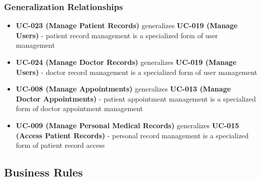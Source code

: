 \documentclass[12pt,a4paper]{article}
\begin{document}
\subsubsection{Generalization Relationships}
\begin{itemize}
    \item \textbf{UC-023 (Manage Patient Records)} generalizes \textbf{UC-019 (Manage Users)} - patient record management is a specialized form of user management
    \item \textbf{UC-024 (Manage Doctor Records)} generalizes \textbf{UC-019 (Manage Users)} - doctor record management is a specialized form of user management
    \item \textbf{UC-008 (Manage Appointments)} generalizes \textbf{UC-013 (Manage Doctor Appointments)} - patient appointment management is a specialized form of doctor appointment management
    \item \textbf{UC-009 (Manage Personal Medical Records)} generalizes \textbf{UC-015 (Access Patient Records)} - personal record management is a specialized form of patient record access
\end{itemize}

\subsection{Business Rules}
\end{document}
